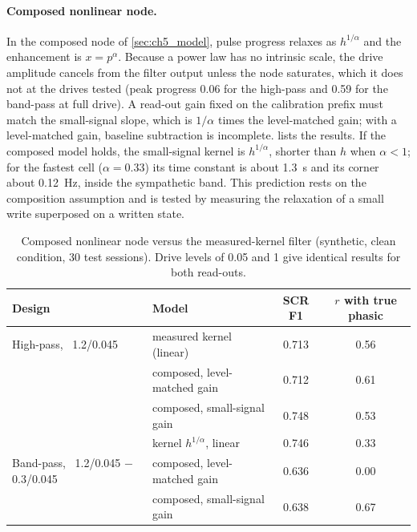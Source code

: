 \paragraph{Composed nonlinear node.} In the composed node of
\cref{sec:ch5_model}, pulse progress relaxes as \(h^{1/\alpha}\) and the
enhancement is \(x=p^{\alpha}\). Because a power law has no intrinsic scale, the
drive amplitude cancels from the filter output unless the node saturates, which
it does not at the drives tested (peak progress \num{0.06} for the high-pass and
\num{0.59} for the band-pass at full drive). A read-out gain fixed on the
calibration prefix must match the small-signal slope, which is \(1/\alpha\) times
the level-matched gain; with a level-matched gain, baseline subtraction is
incomplete.  lists the results. If the composed model holds,
the small-signal kernel is \(h^{1/\alpha}\), shorter than \(h\) when
\(\alpha<1\); for the fastest cell (\(\alpha=\num{0.33}\)) its time constant is
about \SI{1.3}{\second} and its corner about \SI{0.12}{\hertz}, inside the
sympathetic band. This prediction rests on the composition assumption and is
tested by measuring the relaxation of a small write superposed on a written
state.

\begin{table}[t]
  \centering
  \caption[Composed-node sensitivity of the designed filters]{Composed nonlinear node versus the measured-kernel filter (synthetic, clean condition, 30 test sessions). Drive levels of 0.05 and 1 give identical results for both read-outs.}
  \label{tab:ch5_tier2}
  \footnotesize
  \setlength{\tabcolsep}{5pt}
  \begin{tabularx}{\linewidth}{@{}>{\raggedright\arraybackslash}X>{\raggedright\arraybackslash}p{4.4cm}cc@{}}
    \toprule
    Design & Model & SCR F1 & \(r\) with true phasic \\
    \midrule
    High-pass, \PEO{}~1.2/0.045 & measured kernel (linear) & 0.713 & 0.56 \\
                                & composed, level-matched gain & 0.712 & 0.61 \\
                                & composed, small-signal gain & 0.748 & 0.53 \\
                                & kernel \(h^{1/\alpha}\), linear & 0.746 & 0.33 \\
    Band-pass, \PEO{}~1.2/0.045 $-$ 0.3/0.045 & composed, level-matched gain & 0.636 & 0.00 \\
                                & composed, small-signal gain & 0.638 & 0.67 \\
    \bottomrule
  \end{tabularx}
\end{table}

